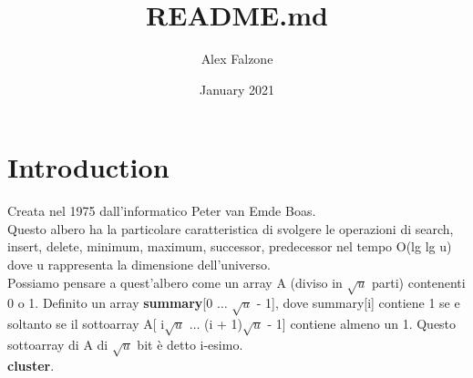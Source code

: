 \documentclass{article}
\title{README.md}
\author{Alex Falzone }
\date{January 2021}
\begin{document}
\maketitle

\section{Introduction}
    Creata nel 1975 dall'informatico Peter van Emde Boas.\\
    Questo albero ha la particolare caratteristica di svolgere le operazioni di search, insert, delete, minimum, maximum, successor, predecessor nel tempo O(lg lg u) dove u rappresenta la dimensione dell'universo.\\
    Possiamo pensare a quest'albero come un array A (diviso in $\sqrt{u}$ parti) contenenti 0 o 1. 
    Definito un array \textbf{summary}[0 $\dots$ $\sqrt{u}$ - 1], dove summary[i] contiene 1 se e soltanto se il sottoarray A[ i$\sqrt{u}$ $\dots$ (i + 1)$\sqrt{u}$ - 1] contiene almeno un 1. Questo sottoarray di A di $\sqrt{u}$ bit è detto i-esimo.\\ \textbf{cluster}.
\end{document}
